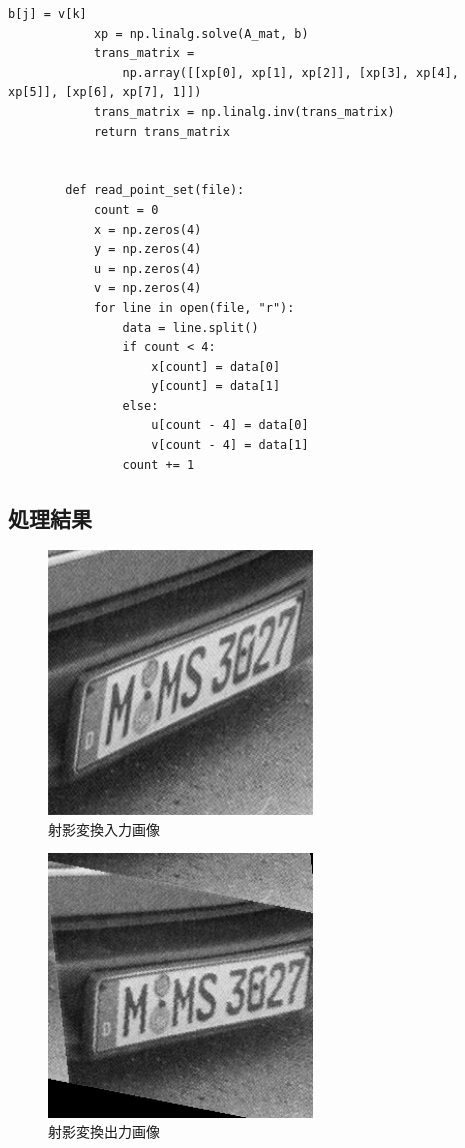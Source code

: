 \documentclass[11pt,a4j]{jsarticle}
\begin{document}
\begin{lstlisting}[basicstyle=\ttfamily\footnotesize, frame=single]
                b[j] = v[k]
            xp = np.linalg.solve(A_mat, b)
            trans_matrix =
                np.array([[xp[0], xp[1], xp[2]], [xp[3], xp[4], xp[5]], [xp[6], xp[7], 1]])
            trans_matrix = np.linalg.inv(trans_matrix)
            return trans_matrix


        def read_point_set(file):
            count = 0
            x = np.zeros(4)
            y = np.zeros(4)
            u = np.zeros(4)
            v = np.zeros(4)
            for line in open(file, "r"):
                data = line.split()
                if count < 4:
                    x[count] = data[0]
                    y[count] = data[1]
                else:
                    u[count - 4] = data[0]
                    v[count - 4] = data[1]
                count += 1
    \end{lstlisting}
    \subsection{処理結果}
    \begin{figure}[H]
      \centering
      \includegraphics[clip,width=7.0cm ,height= 7.0cm]{./img/homo/homo_source.png}
      \caption{射影変換入力画像\label{fig:homo_source}}
    \end{figure}
    \begin{figure}[H]
      \centering
      \includegraphics[clip,width=7.0cm ,height= 7.0cm]{./img/homo/homo.png}
      \caption{射影変換出力画像\label{fig:homo_result}}
    \end{figure}
\end{document}
